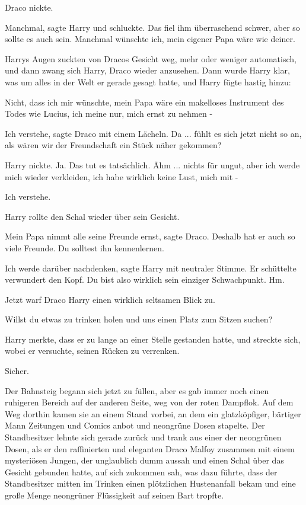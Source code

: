 Draco nickte.

\glqq{}Manchmal\grqq{}, sagte Harry und schluckte. Das fiel ihm überraschend
schwer, aber so sollte es auch sein. \glqq{}Manchmal wünschte ich, mein eigener
Papa wäre wie deiner.\grqq{}

Harrys Augen zuckten von Dracos Gesicht weg, mehr oder weniger automatisch, und
dann zwang sich Harry, Draco wieder anzusehen. Dann wurde Harry klar, was um
alles in der Welt er gerade gesagt hatte, und Harry fügte hastig hinzu:

\glqq{}Nicht, dass ich mir wünschte, mein Papa wäre ein makelloses Instrument des
Todes wie Lucius, ich meine nur, mich ernst zu nehmen -\grqq{}

\glqq{}Ich verstehe\grqq{}, sagte Draco mit einem Lächeln. \glqq{}Da ... fühlt
es sich jetzt nicht so an, als wären wir der Freundschaft ein Stück näher
gekommen?\grqq{}

Harry nickte. \glqq{}Ja. Das tut es tatsächlich. Ähm ... nichts für ungut, aber
ich werde mich wieder verkleiden, ich habe wirklich keine Lust, mich mit
-\grqq{}

\glqq{}Ich verstehe.\grqq{}

Harry rollte den Schal wieder über sein Gesicht.

\glqq{}Mein Papa nimmt alle seine Freunde ernst\grqq{}, sagte Draco. \glqq{}
Deshalb hat er auch so viele Freunde. Du solltest ihn kennenlernen.\grqq{}

\glqq{}Ich werde darüber nachdenken\grqq{}, sagte Harry mit neutraler Stimme. Er
schüttelte verwundert den Kopf. \glqq{}Du bist also wirklich sein einziger
Schwachpunkt. Hm.\grqq{}

Jetzt warf Draco Harry einen wirklich seltsamen Blick zu.

\glqq{}Willst du etwas zu trinken holen und uns einen Platz zum Sitzen
suchen?\grqq{}

Harry merkte, dass er zu lange an einer Stelle gestanden hatte, und streckte
sich, wobei er versuchte, seinen Rücken zu verrenken.

\glqq{}Sicher.\grqq{}

Der Bahnsteig begann sich jetzt zu füllen, aber es gab immer noch einen
ruhigeren Bereich auf der anderen Seite, weg von der roten Dampflok. Auf dem Weg
dorthin kamen sie an einem Stand vorbei, an dem ein glatzköpfiger, bärtiger Mann
Zeitungen und Comics anbot und neongrüne Dosen stapelte. Der Standbesitzer
lehnte sich gerade zurück und trank aus einer der neongrünen Dosen, als er den
raffinierten und eleganten Draco Malfoy zusammen mit einem mysteriösen Jungen,
der unglaublich dumm aussah und einen Schal über das Gesicht gebunden hatte, auf
sich zukommen sah, was dazu führte, dass der Standbesitzer mitten im Trinken
einen plötzlichen Hustenanfall bekam und eine große Menge neongrüner Flüssigkeit
auf seinen Bart tropfte.

